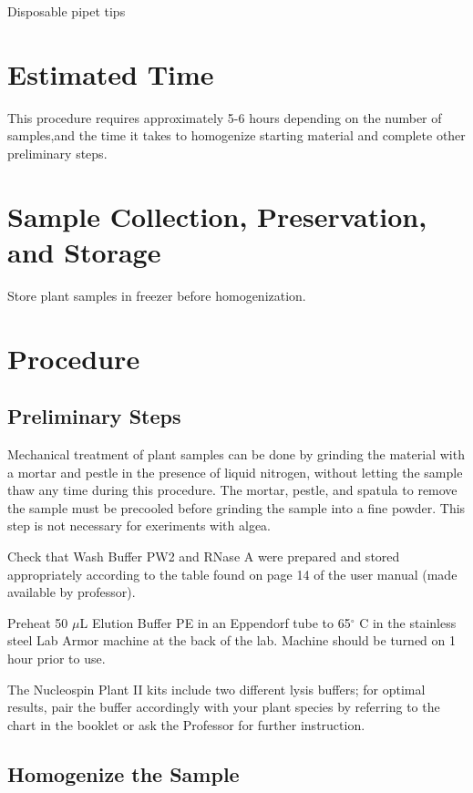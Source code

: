 \documentclass[12pt]{../SOP3_alpha}\usepackage[]{graphicx}\usepackage[]{color}
\begin{document}
\NP Disposable pipet tips


\section{Estimated Time}

\NP This procedure requires approximately 5-6 hours depending on the number of samples,and the time it takes to homogenize starting material and complete other preliminary steps. 

\section{Sample Collection, Preservation, and Storage}

\NP Store plant samples in freezer before homogenization.

\section{Procedure}

\subsection*{Preliminary Steps}
	 
\NP Mechanical treatment of plant samples can be done by grinding the material with a mortar and pestle in the presence of liquid nitrogen, without letting the sample thaw any time during this procedure. The mortar, pestle, and spatula to remove the sample must be precooled before grinding the sample into a fine powder. This step is not necessary for exeriments with algea.

\NP	Check that Wash Buffer PW2 and RNase A were prepared and stored appropriately according to the table found on page 14 of the user manual (made available by professor).

\NP Preheat 50 $\mu$L Elution Buffer PE in an Eppendorf tube to 65$^\circ$ C in the stainless steel Lab Armor machine at the back of the lab. Machine should be turned on 1 hour prior to use.

\NP The Nucleospin Plant II kits include two different lysis buffers; for optimal results, pair the buffer accordingly with your plant species by referring to the chart in the booklet or ask the Professor for further instruction. 


\subsection*{Homogenize the Sample}
\end{document}
